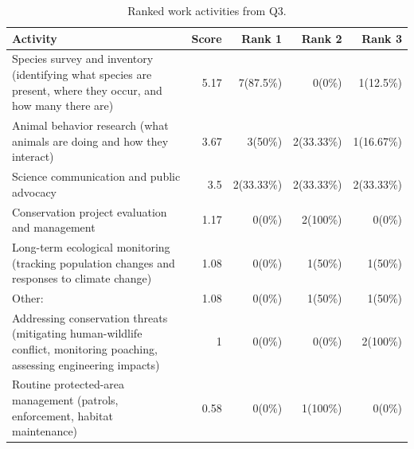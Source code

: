 \begin{table}[h]
\centering
\caption{Ranked work activities from Q3.}
\label{tab:questionnaire_ranked_work}
\scriptsize
\setlength{\tabcolsep}{3pt}
\begin{tabularx}{\linewidth}{Xrrrr}
\toprule
Activity & Score & Rank 1 & Rank 2 & Rank 3 \\
\midrule
Species survey and inventory (identifying what species are present, where they occur, and how many there are) & 5.17 & 7(87.5\%) & 0(0\%) & 1(12.5\%) \\
Animal behavior research (what animals are doing and how they interact) & 3.67 & 3(50\%) & 2(33.33\%) & 1(16.67\%) \\
Science communication and public advocacy & 3.5 & 2(33.33\%) & 2(33.33\%) & 2(33.33\%) \\
Conservation project evaluation and management & 1.17 & 0(0\%) & 2(100\%) & 0(0\%) \\
Long-term ecological monitoring (tracking population changes and responses to climate change) & 1.08 & 0(0\%) & 1(50\%) & 1(50\%) \\
Other: & 1.08 & 0(0\%) & 1(50\%) & 1(50\%) \\
Addressing conservation threats (mitigating human-wildlife conflict, monitoring poaching, assessing engineering impacts) & 1 & 0(0\%) & 0(0\%) & 2(100\%) \\
Routine protected-area management (patrols, enforcement, habitat maintenance) & 0.58 & 0(0\%) & 1(100\%) & 0(0\%) \\
\bottomrule
\end{tabularx}
\end{table}

